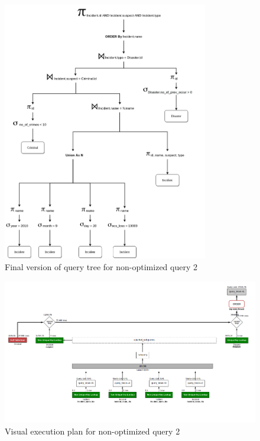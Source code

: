 \begin{figure}[H]
    \centering
    \includegraphics[width=0.8\textwidth]{images/query_trees/query2-non-optimized-final-version.png}
    \caption{Final version of query tree for non-optimized query 2}
\end{figure}
\begin{figure}[H]
    \centering
    \includegraphics[width=\textwidth]{images/execution_plans/q2-2-new.png}
    \caption{Visual execution plan for non-optimized query 2}
\end{figure}

